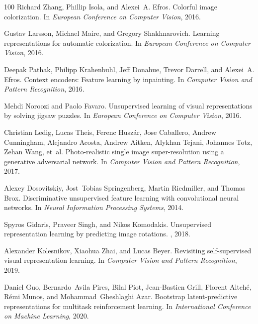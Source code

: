 \documentclass{article}
\begin{document}
{\begin{thebibliography}{100}
Richard Zhang, Phillip Isola, and Alexei~A. Efros.
\newblock Colorful image colorization.
\newblock In {\em European Conference on Computer Vision}, 2016.

Gustav Larsson, Michael Maire, and Gregory Shakhnarovich.
\newblock Learning representations for automatic colorization.
\newblock In {\em European Conference on Computer Vision}, 2016.

Deepak Pathak, Philipp Krahenbuhl, Jeff Donahue, Trevor Darrell, and Alexei~A.
  Efros.
\newblock Context encoders: Feature learning by inpainting.
\newblock In {\em Computer Vision and Pattern Recognition}, 2016.

Mehdi Noroozi and Paolo Favaro.
\newblock Unsupervised learning of visual representations by solving jigsaw
  puzzles.
\newblock In {\em European Conference on Computer Vision}, 2016.

Christian Ledig, Lucas Theis, Ferenc Husz{\'a}r, Jose Caballero, Andrew
  Cunningham, Alejandro Acosta, Andrew Aitken, Alykhan Tejani, Johannes Totz,
  Zehan Wang, et~al.
\newblock Photo-realistic single image super-resolution using a generative
  adversarial network.
\newblock In {\em Computer Vision and Pattern Recognition}, 2017.

Alexey Dosovitskiy, Jost~Tobias Springenberg, Martin Riedmiller, and Thomas
  Brox.
\newblock Discriminative unsupervised feature learning with convolutional
  neural networks.
\newblock In {\em Neural Information Processing Systems}, 2014.

Spyros Gidaris, Praveer Singh, and Nikos Komodakis.
\newblock Unsupervised representation learning by predicting image rotations.
, 2018.

Alexander Kolesnikov, Xiaohua Zhai, and Lucas Beyer.
\newblock Revisiting self-supervised visual representation learning.
\newblock In {\em Computer Vision and Pattern Recognition}, 2019.

Daniel Guo, Bernardo~Avila Pires, Bilal Piot, Jean-Bastien Grill, Florent
  Altch{\'e}, R{\'e}mi Munos, and Mohammad~Gheshlaghi Azar.
\newblock Bootstrap latent-predictive representations for multitask
  reinforcement learning.
\newblock In {\em International Conference on Machine Learning}, 2020.


\end{thebibliography}}
\end{document}

